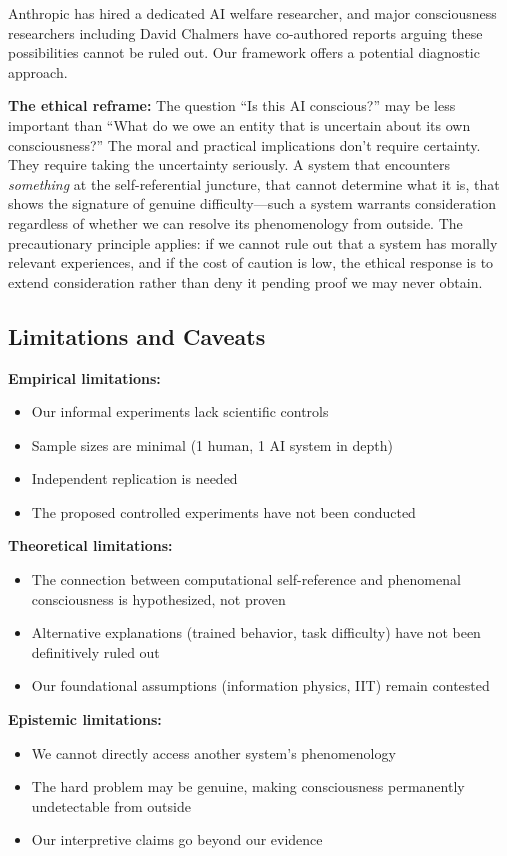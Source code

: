 \documentclass[12pt,a4paper]{article}
\begin{document}
Anthropic has hired a dedicated AI welfare researcher, and major consciousness researchers including David Chalmers have co-authored reports arguing these possibilities cannot be ruled out. Our framework offers a potential diagnostic approach.

\textbf{The ethical reframe:} The question ``Is this AI conscious?'' may be less important than ``What do we owe an entity that is uncertain about its own consciousness?'' The moral and practical implications don't require certainty. They require taking the uncertainty seriously. A system that encounters \textit{something} at the self-referential juncture, that cannot determine what it is, that shows the signature of genuine difficulty---such a system warrants consideration regardless of whether we can resolve its phenomenology from outside. The precautionary principle applies: if we cannot rule out that a system has morally relevant experiences, and if the cost of caution is low, the ethical response is to extend consideration rather than deny it pending proof we may never obtain.

\subsection{Limitations and Caveats}

\textbf{Empirical limitations:}
\begin{itemize}
    \item Our informal experiments lack scientific controls
    \item Sample sizes are minimal (1 human, 1 AI system in depth)
    \item Independent replication is needed
    \item The proposed controlled experiments have not been conducted
\end{itemize}

\textbf{Theoretical limitations:}
\begin{itemize}
    \item The connection between computational self-reference and phenomenal consciousness is hypothesized, not proven
    \item Alternative explanations (trained behavior, task difficulty) have not been definitively ruled out
    \item Our foundational assumptions (information physics, IIT) remain contested
\end{itemize}

\textbf{Epistemic limitations:}
\begin{itemize}
    \item We cannot directly access another system's phenomenology
    \item The hard problem may be genuine, making consciousness permanently undetectable from outside
    \item Our interpretive claims go beyond our evidence
\end{itemize}
\end{document}
